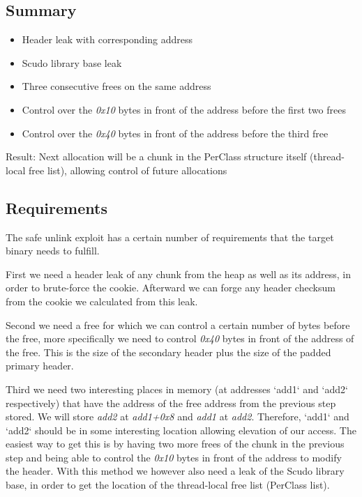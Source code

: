 \documentclass[a4paper,11pt,oneside]{report}
\begin{document}
\subsection{Summary}

\begin{itemize}
\item Header leak with corresponding address
\item Scudo library base leak
\item Three consecutive frees on the same address
\item Control over the \emph{0x10} bytes in front of the address before the first two
  frees
\item Control over the \emph{0x40} bytes in front of the address before the third free
\end{itemize}

Result: Next allocation will be a chunk in the PerClass structure itself (thread-local
free list), allowing control of future allocations


\subsection{Requirements}

The safe unlink exploit has a certain number of requirements that the target binary needs
to fulfill.

First we need a header leak of any chunk from the heap as well as its address, in
order to brute-force the cookie. Afterward we can forge any header checksum from the
cookie we calculated from this leak.

Second we need a free for which we can control a certain number of bytes before the free,
more specifically we need to control \emph{0x40} bytes in front of the address of the
free. This is the size of the secondary header plus the size of the padded primary header.

Third we need two interesting places in memory (at addresses `add1` and `add2`
respectively) that have the address of the free address from the previous step stored. We
will store \emph{add2} at \emph{add1+0x8} and \emph{add1} at \emph{add2}. Therefore, `add1`
and `add2` should be in some interesting location allowing elevation of our access.  The
easiest way to get this is by having two more frees of the chunk in the previous step and
being able to control the \emph{0x10} bytes in front of the address to modify the
header. With this method we however also need a leak of the Scudo library base, in order to
get the location of the thread-local free list (PerClass list).
\end{document}
